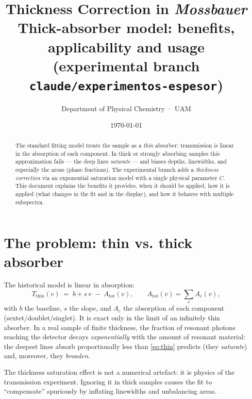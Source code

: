 \documentclass[11pt,a4paper]{article}
\title{\textbf{Thickness Correction in \emph{Mossbauer}}\\[3pt]
\large Thick-absorber model: benefits, applicability and usage\\
\normalsize\textcolor{black!60}{(experimental branch \texttt{claude/experimentos-espesor})}}
\author{Department of Physical Chemistry · UAM}
\date{\today}
\begin{document}
\maketitle

\begin{abstract}\noindent
The standard fitting model treats the sample as a \emph{thin} absorber:
transmission is linear in the absorption of each component. In thick
or strongly absorbing samples this approximation fails — the deep lines
\emph{saturate} — and biases depths, linewidths, and especially the areas
(phase fractions).
The experimental branch adds a \emph{thickness correction} via an exponential
saturation model with a single physical parameter $C$. This document explains
the benefits it provides, when it should be applied, how it is applied (what
changes in the fit and in the display), and how it behaves with multiple
subspectra.
\end{abstract}

\tableofcontents
\bigskip

\section{The problem: thin vs. thick absorber}

The historical model is linear in absorption:
\begin{equation}
  T_{\text{thin}}(v) \;=\; b + s\,v \;-\; A_{\text{tot}}(v),
  \qquad A_{\text{tot}}(v)=\sum_{c} A_c(v),
  \label{eq:thin}
\end{equation}
with $b$ the baseline, $s$ the slope, and $A_c$ the absorption of each component
(sextet/doublet/singlet). It is exact only in the limit of an infinitely thin
absorber. In a real sample of finite thickness, the fraction of resonant photons
reaching the detector decays \emph{exponentially} with the amount of resonant
material: the deepest lines absorb proportionally less than \eqref{eq:thin}
predicts (they \emph{saturate}) and, moreover, they \emph{broaden}.

\begin{nota}
The thickness saturation effect is not a numerical artefact: it is physics of
the transmission experiment. Ignoring it in thick samples causes the fit to
``compensate'' spuriously by inflating linewidths and unbalancing areas.
\end{nota}

\end{document}
